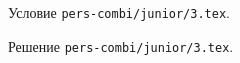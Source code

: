 \problem
Условие \texttt{pers-combi/junior/3.tex}.

\solution Решение \texttt{pers-combi/junior/3.tex}.
\endproblem
